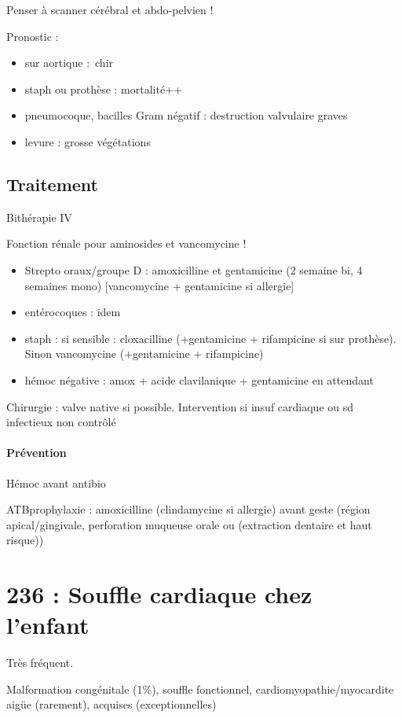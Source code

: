 \documentclass{article}
\begin{document}
Penser à scanner cérébral et abdo-pelvien !

Pronostic : 
\begin{itemize}
  \item sur aortique : chir
  \item staph ou prothèse : mortalité++
  \item pneumocoque, bacilles Gram négatif : destruction valvulaire graves
  \item levure : grosse végétations
\end{itemize}

\subsection{Traitement}
Bithérapie IV

Fonction rénale pour aminosides et vancomycine !

\begin{itemize}
  \item Strepto oraux/groupe D : amoxicilline et gentamicine (2 semaine bi, 4
    semaines mono) [vancomycine + gentamicine si allergie]
  \item entérocoques : idem
  \item staph : si sensible : cloxacilline (+gentamicine + rifampicine si sur
    prothèse). Sinon vancomycine (+gentamicine + rifampicine)
  \item hémoc négative :  amox + acide clavilanique + gentamicine en attendant
\end{itemize}

Chirurgie : valve native si possible. Intervention si insuf cardiaque ou sd
infectieux non contrôlé

\paragraph{Prévention}
Hémoc avant antibio \danger

ATBprophylaxie : amoxicilline (clindamycine si allergie) avant geste (région
apical/gingivale, perforation muqueuse orale ou (extraction dentaire et haut
risque))

\section{236 : Souffle cardiaque chez l'enfant}%
\label{sec:236_souffle_cardiaque_chez_l_enfant}
Très fréquent.

Malformation congénitale (1\%), souffle fonctionnel, cardiomyopathie/myocardite
aigüe (rarement), acquises (exceptionnelles)
\end{document}
